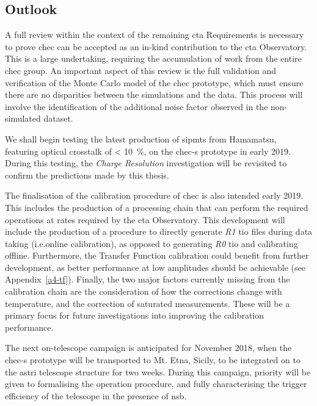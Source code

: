 \subsection{Outlook}
 
A full review within the context of the remaining \gls{cta} Requirements is necessary to prove \gls{chec} can be accepted as an in-kind contribution to the \gls{cta} Observatory. This is a large undertaking, requiring the accumulation of work from the entire \gls{chec} group. An important aspect of this review is the full validation and verification of the Monte Carlo model of the \gls{chec} prototype, which must ensure there are no disparities between the simulations and the data. This process will involve the identification of the additional noise factor observed in the non-simulated dataset.

We shall begin testing the latest production of \glspl{sipmt} from Hamamatsu, featuring optical crosstalk of \SI{< 10}{\percent}, on the \gls{chec-s} prototype in early 2019. During this testing, the \textit{Charge Resolution} investigation will be revisited to confirm the predictions made by this thesis.

The finalisation of the calibration procedure of \gls{chec} is also intended early 2019. This includes the production of a processing chain that can perform the required operations at rates required by the \gls{cta} Observatory. This development will include the production of a procedure to directly generate \textit{R1} \gls{tio} files during data taking (i.e.\@ online calibration), as opposed to generating \textit{R0} \gls{tio} and calibrating offline. Furthermore, the Transfer Function calibration could benefit from further development, as better performance at low amplitudes should be achievable (see Appendix~\ref{a4-tf}). Finally, the two major factors currently missing from the calibration chain are the consideration of how the corrections change with temperature, and the correction of saturated measurements. These will be a primary focus for future investigations into improving the calibration performance.

The next on-telescope campaign is anticipated for November 2018, when the \gls{chec-s} prototype will be transported to Mt. Etna, Sicily, to be integrated on to the \gls{astri} telescope structure for two weeks. During this campaign, priority will be given to formalising the operation procedure, and fully characterising the trigger efficiency of the telescope in the presence of \gls{nsb}.